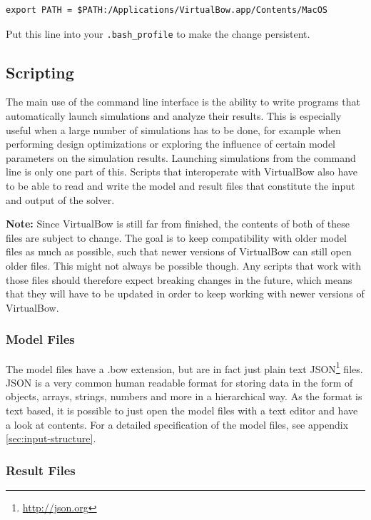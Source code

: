 \documentclass[12pt]{article}
\begin{document}
\begin{framed}
\begin{verbatim}
export PATH = $PATH:/Applications/VirtualBow.app/Contents/MacOS
\end{verbatim}
\end{framed}

Put this line into your \texttt{.bash\_profile} to make the change persistent.

\newpage
\subsection{Scripting}

The main use of the command line interface is the ability to write programs that automatically launch simulations and analyze their results.
This is especially useful when a large number of simulations has to be done, for example when performing design optimizations or exploring the influence of certain model parameters on the simulation results.
Launching simulations from the command line is only one part of this.
Scripts that interoperate with VirtualBow also have to be able to read and write the model and result files that constitute the input and output of the solver.

\textbf{Note:} Since VirtualBow is still far from finished, the contents of both of these files are subject to change.
The goal is to keep compatibility with older model files as much as possible, such that newer versions of VirtualBow can still open older files.
This might not always be possible though.
Any scripts that work with those files should therefore expect breaking changes in the future, which means that they will have to be updated in order to keep working with newer versions of VirtualBow.

\subsubsection*{Model Files}

The model files have a .bow extension, but are in fact just plain text JSON\footnote{\url{http://json.org}} files.
JSON is a very common human readable format for storing data in the form of objects, arrays, strings, numbers and more in a hierarchical way.
As the format is text based, it is possible to just open the model files with a text editor and have a look at contents.
For a detailed specification of the model files, see appendix \ref{sec:input-structure}.

\subsubsection*{Result Files}
\end{document}
